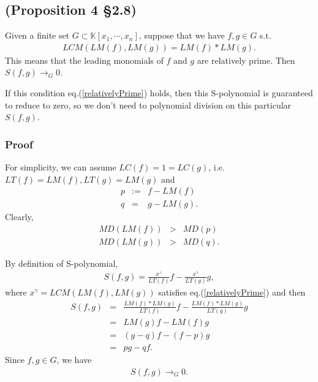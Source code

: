 \documentclass[11pt]{book}
\begin{document}
\subsection{(Proposition 4 \S2.8)}
Given a finite set $G \subset \mathbb{K}[x_1, \cdots, x_n]$, suppose that we have $f,g \in G$ s.t.
\begin{eqnarray}
\label{relativelyPrime}
LCM( LM(f), LM(g)) = LM(f) * LM(g).
\end{eqnarray}
This means that the leading monomials of $f$ and $g$ are relatively prime.
Then $S(f,g) \to_G 0$.

If this condition eq.(\ref{relativelyPrime}) holds, then this S-polynomial is guaranteed to reduce to zero, so we don't need to polynomial division on this particular $S(f,g)$.

\subsubsection{Proof}
For simplicity, we can assume $LC(f) = 1 = LC(g)$, i.e. $LT(f) = LM(f), LT(g) = LM(g)$ and
\begin{eqnarray}
p &:=&f - LM(f)\\
q &=& g - LM(g).
\end{eqnarray}
Clearly,
\begin{eqnarray}
\label{strictSmallnessConditions1}
MD\left( LM(f) \right) &>& MD(p) \\
\label{strictSmallnessConditions2}
MD\left( LM(g) \right) &>& MD(q).
\end{eqnarray}

By definition of S-polynomial,
\begin{eqnarray}
S(f,g) = \frac{x^\gamma}{LT(f)} f - \frac{x^\gamma}{LT(g)} g ,
\end{eqnarray}
where $x^\gamma = LCM( LM(f), LM(g))$ satisfies eq.(\ref{relativelyPrime}) and then
\begin{eqnarray}
S(f,g) &=& \frac{LM(f) * LM(g)}{LT(f)} f - \frac{LM(f) * LM(g)}{LT(g)} g \\
&=& LM(g) f - LM(f) g \\
&=& (g-q)f - (f-p)g \\
&=& pg - qf.
\end{eqnarray}
Since $f,g \in G$, we have
\begin{eqnarray}
S(f,g) \to_G 0.
\end{eqnarray}
\end{document}
